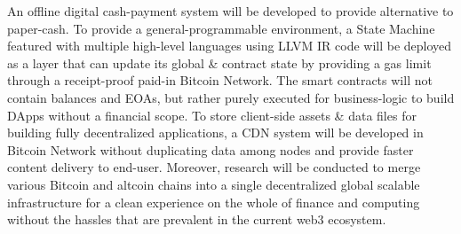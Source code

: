\documentclass[a4paper,	10pt]{extarticle}
\begin{document}
An offline digital cash-payment system will be developed to provide alternative to paper-cash. To provide a general-programmable environment, a State Machine \cite{wood2014ethereum} featured with multiple high-level languages using LLVM \cite{llvm} IR code will be deployed as a layer that can update its global \& contract state by providing a gas limit through a receipt-proof paid-in Bitcoin Network. The smart contracts will not contain balances and EOAs, but rather purely executed for business-logic to build DApps without a financial scope. To store client-side assets \& data files for building fully decentralized applications, a CDN system will be developed in Bitcoin Network without duplicating data among nodes and provide faster content delivery to end-user. Moreover, research will be conducted to merge various Bitcoin and altcoin chains into a single decentralized global scalable infrastructure for a clean experience on the whole of finance and computing without the hassles that are prevalent in the current web3 ecosystem.


\end{document}
